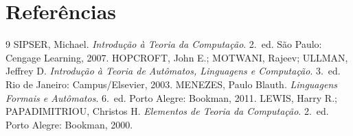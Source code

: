 \documentclass[12pt,a4paper]{article}
\begin{document}
\newpage
\section*{Referências}
\begin{thebibliography}{9}
 SIPSER, Michael. \textit{Introdução à Teoria da Computação}.
2.~ed. São Paulo: Cengage Learning, 2007.
 HOPCROFT, John E.; MOTWANI, Rajeev; ULLMAN, Jeffrey D.
\textit{Introdução à Teoria de Autômatos, Linguagens e Computação}. 3.~ed. Rio de
Janeiro: Campus/Elsevier, 2003.
 MENEZES, Paulo Blauth. \textit{Linguagens Formais e Autômatos}.
6.~ed. Porto Alegre: Bookman, 2011.
 LEWIS, Harry R.; PAPADIMITRIOU, Christos H.
\textit{Elementos de Teoria da Computação}. 2.~ed. Porto Alegre: Bookman, 2000.
\end{thebibliography}
\end{document}
